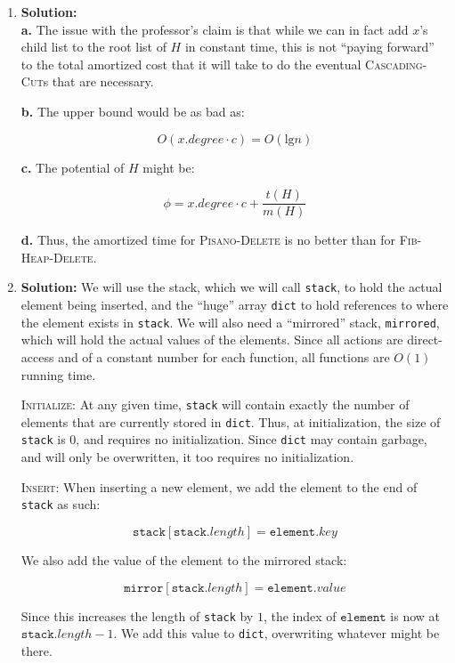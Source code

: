 \documentclass{article}
\begin{document}
\begin{enumerate}
    \item \textbf{Solution:} \\
    \textbf{a.} The issue with the professor's claim is that while we can in
    fact add $x$'s child list to the root list of $H$ in constant time, this is
    not ``paying forward'' to the total amortized cost that it will take to do
    the eventual \textsc{Cascading-Cut}s that are necessary.

    \textbf{b.} The upper bound would be as bad as:

    $$ O(x.degree \cdot c) = O(\text{lg}n) $$

    \textbf{c.} The potential of $H$ might be:

    $$ \phi = x.degree \cdot c + \frac{t(H)}{m(H)} $$

    \textbf{d.} Thus, the amortized time for \textsc{Pisano-Delete} is no better
    than for \textsc{Fib-Heap-Delete}.

    \item \textbf{Solution:}
    We will use the stack, which we will call \texttt{stack}, to hold the actual
    element being inserted, and the ``huge'' array \texttt{dict} to hold
    references to where the element exists in \texttt{stack}. We will also need
    a ``mirrored'' stack, \texttt{mirrored}, which will hold the actual values
    of the elements. Since all actions are direct-access and of a constant
    number for each function, all functions are $O(1)$ running time.

    \textsc{Initialize}: At any given time, \texttt{stack} will contain
    exactly the number of elements that are currently stored in \texttt{dict}.
    Thus, at initialization, the size of \texttt{stack} is $0$, and requires no
    initialization. Since \texttt{dict} may contain garbage, and will only be
    overwritten, it too requires no initialization.

    \textsc{Insert}: When inserting a new element, we add the element to the
    end of \texttt{stack} as such:

    $$ \texttt{stack}[\texttt{stack}.length] = \texttt{element}.key $$

    We also add the value of the element to the mirrored stack:

    $$ \texttt{mirror}[\texttt{stack}.length] = \texttt{element}.value $$

    Since this increases the length of \texttt{stack} by $1$, the index of
    $\texttt{element}$ is now at $\texttt{stack}.length - 1$. We add this
    value to \texttt{dict}, overwriting whatever might be there.


\end{enumerate}
\end{document}
